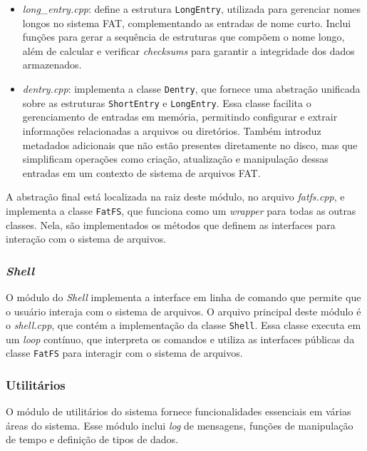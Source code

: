 \documentclass[
    12pt,				%
    oneside,   	        %
    a4paper,			%
    english,			%
    french,				%
    spanish,			%
    brazil,				%
    ]{pacotes/abntex2}
\begin{document}
\begin{itemize}
\begin{itemize}
        \item \textit{long\_entry.cpp}: define a estrutura \texttt{LongEntry}, utilizada para gerenciar nomes longos no sistema FAT, complementando as entradas de nome curto. Inclui funções para gerar a sequência de estruturas que compõem o nome longo, além de calcular e verificar \textit{checksums} para garantir a integridade dos dados armazenados.

        \item \textit{dentry.cpp}: implementa a classe \texttt{Dentry}, que fornece uma abstração unificada sobre as estruturas \texttt{ShortEntry} e \texttt{LongEntry}. Essa classe facilita o gerenciamento de entradas em memória, permitindo configurar e extrair informações relacionadas a arquivos ou diretórios. Também introduz metadados adicionais que não estão presentes diretamente no disco, mas que simplificam operações como criação, atualização e manipulação dessas entradas em um contexto de sistema de arquivos FAT.
    \end{itemize}
\end{itemize}

A abstração final está localizada na raiz deste módulo, no arquivo \textit{fatfs.cpp}, e implementa a classe \texttt{FatFS}, que funciona como um \textit{wrapper} para todas as outras classes. Nela, são implementados os métodos que definem as interfaces para interação com o sistema de arquivos.

\subsubsection{\textit{Shell}}
\label{subsubsec:shell}

O módulo do \textit{Shell} implementa a interface em linha de comando que permite que o usuário interaja com o sistema de arquivos. O arquivo principal deste módulo é o \textit{shell.cpp}, que contém a implementação da classe \texttt{Shell}. Essa classe executa em um \textit{loop} contínuo, que interpreta os comandos e utiliza as interfaces públicas da classe \texttt{FatFS} para interagir com o sistema de arquivos.

\subsubsection{Utilitários}
\label{subsubsec:utils}

O módulo de utilitários do sistema fornece funcionalidades essenciais em várias áreas do sistema. Esse módulo inclui \textit{log} de mensagens, funções de manipulação de tempo e definição de tipos de dados.
\end{document}

